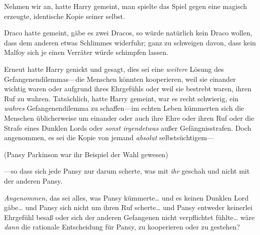 Nehmen wir an, hatte Harry gemeint, man spielte das Spiel gegen eine magisch erzeugte, identische Kopie seiner selbst.

Draco hatte gemeint, gäbe es zwei Dracos, so würde natürlich kein Draco wollen, dass dem anderen etwas Schlimmes widerfuhr; ganz zu schweigen davon, dass kein Malfoy sich je einen Verräter würde schimpfen lassen.

Erneut hatte Harry genickt und gesagt, dies sei eine \emph{weitere} Lösung des Gefangenendilemmas—die Menschen könnten kooperieren, weil sie einander wichtig waren oder aufgrund ihres Ehrgefühls oder weil sie bestrebt waren, ihren Ruf zu wahren. Tatsächlich, hatte Harry gemeint, war es recht schwierig, ein \emph{wahres} Gefangenendilemma zu schaffen—im echten Leben kümmerten sich die Menschen üblicherweise um einander oder auch ihre Ehre oder ihren Ruf oder die Strafe eines Dunklen Lords oder \emph{sonst irgendetwas} außer Gefängnisstrafen. Doch angenommen, es sei die Kopie von jemand \emph{absolut} selbstsüchtigem—

(Pansy Parkinson war ihr Beispiel der Wahl gewesen)

—so dass sich jede Pansy nur darum scherte, was mit \emph{ihr} geschah und nicht mit der anderen Pansy.

\emph{Angenommen}, das sei alles, was Pansy kümmerte… und es keinen Dunklen Lord gäbe… und Pansy sich nicht um ihren Ruf scherte… und Pansy entweder keinerlei Ehrgefühl besaß oder sich der anderen Gefangenen nicht verpflichtet fühlte… wäre \emph{dann} die rationale Entscheidung für Pansy, zu kooperieren oder zu gestehen?

